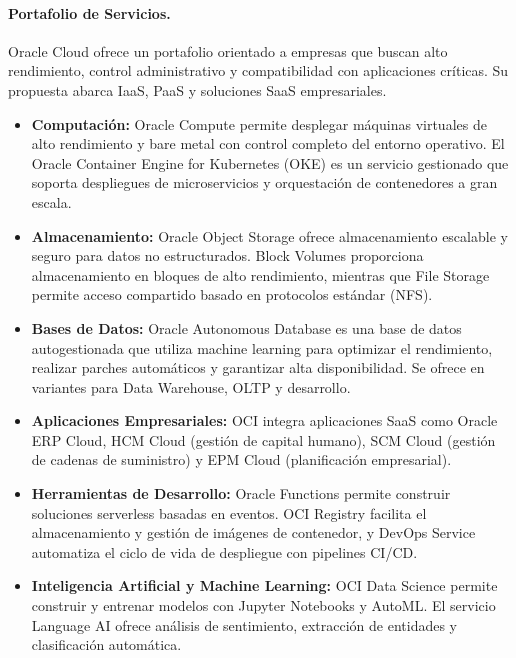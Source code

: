 {                \paragraph{Portafolio de Servicios.}                
                Oracle Cloud ofrece un portafolio orientado a empresas que buscan alto rendimiento, control administrativo y compatibilidad con aplicaciones críticas. Su propuesta abarca IaaS, PaaS y soluciones SaaS empresariales.
                
                \begin{itemize}
                    \item \textbf{Computación:} Oracle Compute permite desplegar máquinas virtuales de alto rendimiento y bare metal con control completo del entorno operativo. El Oracle Container Engine for Kubernetes (OKE) es un servicio gestionado que soporta despliegues de microservicios y orquestación de contenedores a gran escala.
                    \item \textbf{Almacenamiento:} Oracle Object Storage ofrece almacenamiento escalable y seguro para datos no estructurados. Block Volumes proporciona almacenamiento en bloques de alto rendimiento, mientras que File Storage permite acceso compartido basado en protocolos estándar (NFS).
                    \item \textbf{Bases de Datos:} Oracle Autonomous Database es una base de datos autogestionada que utiliza machine learning para optimizar el rendimiento, realizar parches automáticos y garantizar alta disponibilidad. Se ofrece en variantes para Data Warehouse, OLTP y desarrollo.
                    \item \textbf{Aplicaciones Empresariales:} OCI integra aplicaciones SaaS como Oracle ERP Cloud, HCM Cloud (gestión de capital humano), SCM Cloud (gestión de cadenas de suministro) y EPM Cloud (planificación empresarial).
                    \item \textbf{Herramientas de Desarrollo:} Oracle Functions permite construir soluciones serverless basadas en eventos. OCI Registry facilita el almacenamiento y gestión de imágenes de contenedor, y DevOps Service automatiza el ciclo de vida de despliegue con pipelines CI/CD.
                    \item \textbf{Inteligencia Artificial y Machine Learning:} OCI Data Science permite construir y entrenar modelos con Jupyter Notebooks y AutoML. El servicio Language AI ofrece análisis de sentimiento, extracción de entidades y clasificación automática.
                \end{itemize}
                
}

